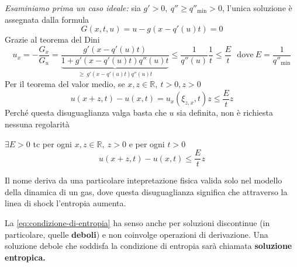\documentclass[10pt,a4paper,twoside,openright]{book}
\begin{document}
\emph{Esaminiamo prima un caso ideale:} sia $\displaystyle g' >0,\ q''\geqslant q''_{\min}  >0$, l'unica soluzione è assegnata dalla formula 
\begin{equation}
	G( x,t,u) =u-g( x-q'( u) t) =0
\end{equation}
Grazie al teorema del Dini 
\begin{equation*}
	u_{x} =-\frac{G_{x}}{G_{u}} =\frac{g'( x-q'( u) t)}{\underbrace{1+g'( x-q'( u) t) q''( u) t}_{\geqslant \ g'( x-q'( u) t) q''( u) t}} \leqslant \frac{1}{q''( u)}\frac{1}{t} \leqslant \frac{E}{t} \ \ \ \text{dove} \ E=\frac{1}{q''_{\min}}
\end{equation*}
Per il teorema del valor medio, se $\displaystyle x,z\in \mathbb{R} ,\ t >0,z >0\ $
\begin{equation*}
	u( x+z,t) -u( x,t) =u_{x}( \xi _{z,x} ,t) z\leqslant \frac{E}{t} z
\end{equation*}
Perché questa disuguaglianza valga basta che $\displaystyle u$ sia definita, non è richiesta nessuna regolarità
\begin{definition}
	 $\displaystyle \exists E >0$ tc per ogni $\displaystyle x,z\in \mathbb{R} ,\ z >0$ e per ogni $\displaystyle t >0$
	\begin{equation}
		u( x+z,t) -u( x,t) \leqslant \frac{E}{t} z
		\label{eq:condizione-di-entropia}
	\end{equation}
\end{definition}
Il nome deriva da una particolare intepretazione fisica valida solo nel modello della dinamica di un gas, dove questa disuguaglianza significa che attraverso la linea di shock l'entropia aumenta.

La \eqref{eq:condizione-di-entropia} ha senso anche per soluzioni discontinue (in particolare, quelle \textbf{deboli}) e non coinvolge operazioni di derivazione. Una soluzione debole che soddisfa la condizione di entropia sarà chiamata \textbf{soluzione entropica.}
\end{document}
